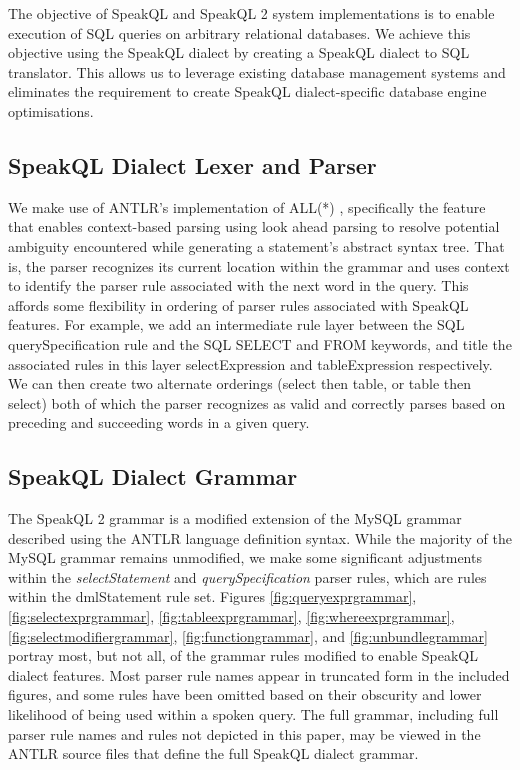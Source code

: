 The objective of SpeakQL and SpeakQL 2 system implementations is to enable execution of SQL queries on arbitrary relational databases. We achieve this objective using the SpeakQL dialect by creating a SpeakQL dialect to SQL translator. This allows us to leverage existing database management systems and eliminates the requirement to create SpeakQL dialect-specific database engine optimisations. 


\subsection{SpeakQL Dialect Lexer and Parser}

We make use of ANTLR's implementation of ALL(*) \cite{Parr2014}, specifically the feature that enables context-based parsing using look ahead parsing to resolve potential ambiguity encountered while generating a statement's abstract syntax tree. That is, the parser recognizes its current location within the grammar and uses context to identify the parser rule associated with the next word in the query. This affords some flexibility in ordering of parser rules associated with SpeakQL features. For example, we add an intermediate rule layer between the SQL querySpecification rule and the SQL SELECT and FROM keywords, and title the associated rules in this layer selectExpression and tableExpression respectively. We can then create two alternate orderings (select then table, or table then select) both of which the parser recognizes as valid and correctly parses based on preceding and succeeding words in a given query.

\subsection{SpeakQL Dialect Grammar}

The SpeakQL 2 grammar is a modified extension of the MySQL grammar \cite{antlrgrammarsv4} described using the ANTLR language definition syntax. While the majority of the MySQL grammar remains unmodified, we make some significant adjustments within the \emph{selectStatement} and \emph{querySpecification} parser rules, which are rules within the dmlStatement rule set. Figures \ref{fig:queryexprgrammar}, \ref{fig:selectexprgrammar}, \ref{fig:tableexprgrammar}, \ref{fig:whereexprgrammar}, \ref{fig:selectmodifiergrammar}, \ref{fig:functiongrammar}, and \ref{fig:unbundlegrammar} portray most, but not all, of the grammar rules modified to enable SpeakQL dialect features. Most parser rule names appear in truncated form in the included figures, and some rules have been omitted based on their obscurity and lower likelihood of being used within a spoken query. The full grammar, including full parser rule names and rules not depicted in this paper, may be viewed in the ANTLR source files that define the full SpeakQL dialect grammar.

